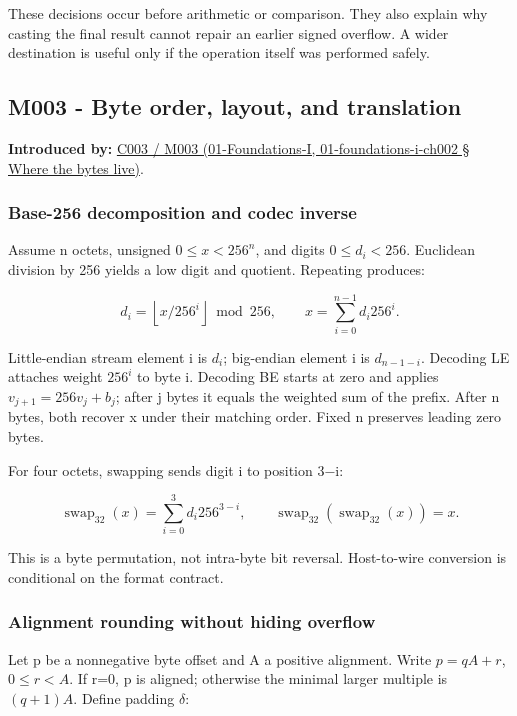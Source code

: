 These decisions occur before arithmetic or comparison. They also explain why casting the final result cannot repair an earlier signed overflow. A wider destination is useful only if the operation itself was performed safely.

\subsection{M003 - Byte order, layout, and translation}\label{m003---byte-order-layout-and-translation}

\textbf{Introduced by:} \href{}{C003 / M003 (01-Foundations-I, 01-foundations-i-ch002 § Where the bytes live)}.

\subsubsection{Base-256 decomposition and codec inverse}\label{base-256-decomposition-and-codec-inverse}

Assume n octets, unsigned \(0\le x<256^n\), and digits \(0\le d_i<256\). Euclidean division by 256 yields a low digit and quotient. Repeating produces:

\[
d_i=\left\lfloor x/256^i\right\rfloor\bmod256,\qquad
x=\sum_{i=0}^{n-1}d_i256^i.
\]

Little-endian stream element i is \(d_i\); big-endian element i is \(d_{n-1-i}\). Decoding LE attaches weight \(256^i\) to byte i. Decoding BE starts at zero and applies \(v_{j+1}=256v_j+b_j\); after j bytes it equals the weighted sum of the prefix. After n bytes, both recover x under their matching order. Fixed n preserves leading zero bytes.

For four octets, swapping sends digit i to position 3−i:

\[
\operatorname{swap}_{32}(x)=\sum_{i=0}^{3}d_i256^{3-i},\qquad
\operatorname{swap}_{32}(\operatorname{swap}_{32}(x))=x.
\]

This is a byte permutation, not intra-byte bit reversal. Host-to-wire conversion is conditional on the format contract.

\subsubsection{Alignment rounding without hiding overflow}\label{alignment-rounding-without-hiding-overflow}

Let p be a nonnegative byte offset and A a positive alignment. Write \(p=qA+r\), \(0\le r<A\). If r=0, p is aligned; otherwise the minimal larger multiple is \((q+1)A\). Define padding \(\delta\):

